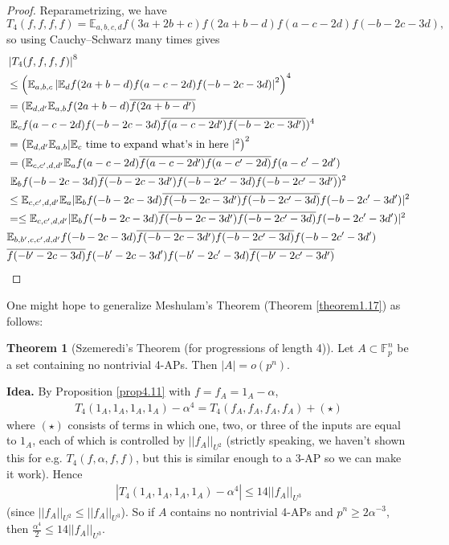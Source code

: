 \documentclass{article}
\theoremstyle{definition}
\newtheorem{theorem}{Theorem}[section]
\begin{document}
\begin{proof}
    Reparametrizing, we have $$T_4(f,f,f,f) = \mathbb{E}_{a,b,c,d}f(3a+2b+c)f(2a+b-d)f(a-c-2d)f(-b-2c-3d),$$
    so using Cauchy--Schwarz many times gives
    \begin{align*}
        &\left|T_4(f,f,f,f)\right|^8\\
        &\le \left(\mathbb{E}_{a,b,c} \left|\mathbb{E}_d f(2a+b-d)f(a-c-2d)f(-b-2c-3d)\right|^2 \right)^4 \\
        &= (\mathbb{E}_{d,d'} \mathbb{E}_{a,b} f(2a+b-d)\overline{f(2a+b-d')}\\
        &~\mathbb{E}_c f(a-c-2d)f(-b-2c-3d)\overline{f(a-c-2d')f(-b-2c-3d')})^4 \\
        &= \left(\mathbb{E}_{d,d'}\mathbb{E}_{a,b}|\mathbb{E}_c \text{ time to expand what's in here }|^2\right)^2 \\
        &= (\mathbb{E}_{c,c',d,d'} \mathbb{E}_a f(a-c-2d)\overline{f(a-c-2d')}\overline{f(a-c'-2d)}f(a-c'-2d')\\
        &~ \mathbb{E}_b f(-b-2c-3d)\overline{f(-b-2c-3d')}\overline{f(-b-2c'-3d)f(-b-2c'-3d')} )^2 \\
        &\le \mathbb{E}_{c,c',d,d'} \mathbb{E}_a | \mathbb{E}_b f(-b-2c-3d)\overline{f(-b-2c-3d')f(-b-2c'-3d)}f(-b-2c'-3d')|^2\\
        &= \le \mathbb{E}_{c,c',d,d'} | \mathbb{E}_b f(-b-2c-3d)\overline{f(-b-2c-3d')f(-b-2c'-3d)}f(-b-2c'-3d')|^2\\
        &\mathbb{E}_{b,b',c,c',d,d'} f(-b-2c-3d)\overline{f(-b-2c-3d')f(-b-2c'-3d)}f(-b-2c'-3d')\\
        &\overline{f(-b'-2c-3d)}f(-b'-2c-3d')f(-b'-2c'-3d)\overline{f(-b'-2c'-3d')}
        \qedhere
    \end{align*}
\end{proof}
One might hope to generalize Meshulam's Theorem (Theorem \ref{theorem1.17}) as follows:
\begin{theorem}[Szemeredi's Theorem (for progressions of length 4)]\label{theorem4.12} 
    Let $A \subset \mathbb{F}_p^n$ be a set containing no nontrivial 4-APs. Then $\left|A\right| = o(p^n).$
\end{theorem}
\textbf{Idea.} By Proposition \ref{prop4.11} with $f = f_A = 1_A -\alpha$, 
\begin{align*}
    T_4(1_A,1_A,1_A,1_A)-\alpha^4 = T_4(f_A,f_A,f_A,f_A) + (\star)
\end{align*} 
where $(\star)$ consists of terms in which one, two, or three of the inputs are equal to $1_A$, each of which is controlled by $||f_A||_{U^2}$ (strictly speaking, we haven't shown this for e.g. $T_4(f,\alpha,f,f)$, but this is similar enough to a 3-AP so we can make it work). Hence 
\begin{align*}
    \left|T_4(1_A,1_A,1_A,1_A)-\alpha^4\right| \le 14||f_A||_{U^3}
\end{align*}
(since $||f_A||_{U^2}\le ||f_A||_{U^3}$). So if $A$ contains no nontrivial 4-APs and $p^n \ge 2\alpha^{-3}$, then $\frac{\alpha^4}{2}\le 14||f_A||_{U^3}$.
\end{document}
